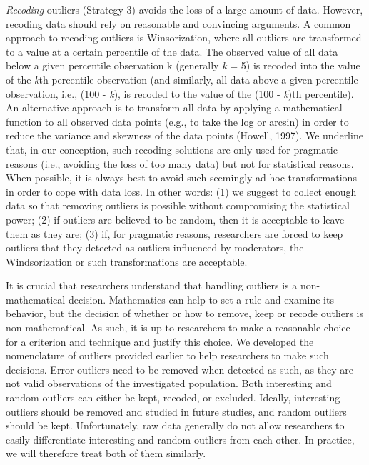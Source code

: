 \documentclass[man,floatsintext]{apa6}
\begin{document}
\emph{Recoding} outliers (Strategy 3) avoids the loss of a large amount of data. However, recoding data should rely on reasonable and convincing arguments. A common approach to recoding outliers is Winsorization, where all outliers are transformed to a value at a certain percentile of the data. The observed value of all data below a given percentile observation k (generally \emph{k} = 5) is recoded into the value of the \emph{k}th percentile observation (and similarly, all data above a given percentile observation, i.e., (100 - \emph{k}), is recoded to the value of the (100 - \emph{k})th percentile). An alternative approach is to transform all data by applying a mathematical function to all observed data points (e.g., to take the log or arcsin) in order to reduce the variance and skewness of the data points (Howell, 1997). We underline that, in our conception, such recoding solutions are only used for pragmatic reasons (i.e., avoiding the loss of too many data) but not for statistical reasons. When possible, it is always best to avoid such seemingly ad hoc transformations in order to cope with data loss. In other words: (1) we suggest to collect enough data so that removing outliers is possible without compromising the statistical power; (2) if outliers are believed to be random, then it is acceptable to leave them as they are; (3) if, for pragmatic reasons, researchers are forced to keep outliers that they detected as outliers influenced by moderators, the Windsorization or such transformations are acceptable.

It is crucial that researchers understand that handling outliers is a non-mathematical decision. Mathematics can help to set a rule and examine its behavior, but the decision of whether or how to remove, keep or recode outliers is non-mathematical. As such, it is up to researchers to make a reasonable choice for a criterion and technique and justify this choice. We developed the nomenclature of outliers provided earlier to help researchers to make such decisions. Error outliers need to be removed when detected as such, as they are not valid observations of the investigated population. Both interesting and random outliers can either be kept, recoded, or excluded. Ideally, interesting outliers should be removed and studied in future studies, and random outliers should be kept. Unfortunately, raw data generally do not allow researchers to easily differentiate interesting and random outliers from each other. In practice, we will therefore treat both of them similarly.
\end{document}
